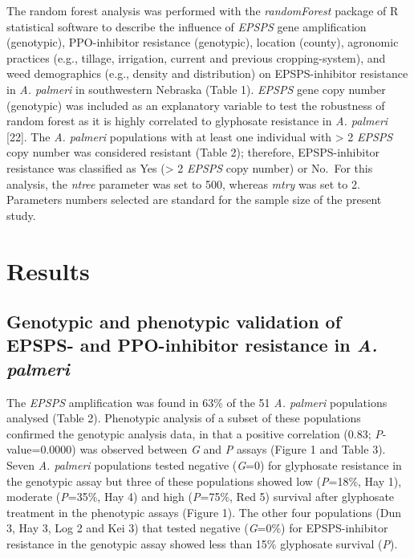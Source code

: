 \documentclass[10pt,letterpaper]{article}
\begin{document}
The random forest analysis was performed with the \emph{randomForest}
package of R statistical software to describe the influence of
\emph{EPSPS} gene amplification (genotypic), PPO-inhibitor resistance
(genotypic), location (county), agronomic practices (e.g., tillage,
irrigation, current and previous cropping-system), and weed demographics
(e.g., density and distribution) on EPSPS-inhibitor resistance in
\emph{A. palmeri} in southwestern Nebraska (Table 1). \emph{EPSPS} gene
copy number (genotypic) was included as an explanatory variable to test
the robustness of random forest as it is highly correlated to glyphosate
resistance in \emph{A. palmeri} {[}22{]}. The \emph{A. palmeri}
populations with at least one individual with \textgreater{} 2
\emph{EPSPS} copy number was considered resistant (Table 2); therefore,
EPSPS-inhibitor resistance was classified as Yes (\textgreater{} 2
\emph{EPSPS} copy number) or No.~For this analysis, the \emph{ntree}
parameter was set to 500, whereas \emph{mtry} was set to 2. Parameters
numbers selected are standard for the sample size of the present study.

\hypertarget{results}{%
\section{Results}\label{results}}

\hypertarget{genotypic-and-phenotypic-validation-of-epsps--and-ppo-inhibitor-resistance-in-a.-palmeri-1}{%
\subsection{\texorpdfstring{Genotypic and phenotypic validation of
EPSPS- and PPO-inhibitor resistance in \emph{A.
palmeri}}{Genotypic and phenotypic validation of EPSPS- and PPO-inhibitor resistance in A. palmeri}}\label{genotypic-and-phenotypic-validation-of-epsps--and-ppo-inhibitor-resistance-in-a.-palmeri-1}}

The \emph{EPSPS} amplification was found in 63\% of the 51 \emph{A.
palmeri} populations analysed (Table 2). Phenotypic analysis of a subset
of these populations confirmed the genotypic analysis data, in that a
positive correlation (0.83; \emph{P}-value=0.0000) was observed between
\emph{G} and \emph{P} assays (Figure 1 and Table 3). Seven \emph{A.
palmeri} populations tested negative (\emph{G}=0) for glyphosate
resistance in the genotypic assay but three of these populations showed
low (\emph{P}=18\%, Hay 1), moderate (\emph{P}=35\%, Hay 4) and high
(\emph{P}=75\%, Red 5) survival after glyphosate treatment in the
phenotypic assays (Figure 1). The other four populations (Dun 3, Hay 3,
Log 2 and Kei 3) that tested negative (\emph{G}=0\%) for EPSPS-inhibitor
resistance in the genotypic assay showed less than 15\% glyphosate
survival (\emph{P}).
\end{document}
